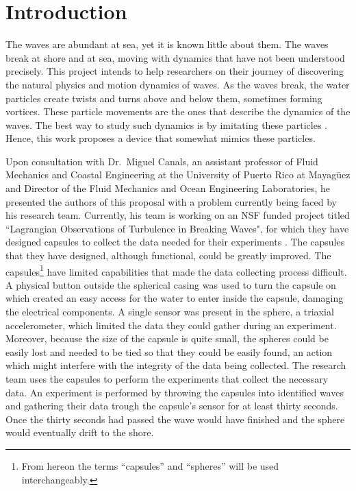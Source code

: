 \section{Introduction}
The waves are abundant at sea, yet it is known little about them. The waves break at shore and at sea, moving with dynamics that have not been understood precisely. This project intends to help researchers on their journey of discovering the natural physics and motion dynamics of waves. As the waves break, the water particles create twists and turns above and below them, sometimes forming vortices. These particle movements are the ones that describe the dynamics of the waves. The best way to study such dynamics is by imitating these particles \cite{Amador2012}. Hence, this work proposes a device that somewhat mimics these particles.

Upon consultation with Dr.~Miguel Canals, an assistant professor of Fluid Mechanics and Coastal Engineering at the University of Puerto Rico at Mayag\"uez and Director of the Fluid Mechanics and Ocean Engineering Laboratories, he presented the authors of this proposal with a problem currently being faced by his research team. Currently, his team is working on an NSF funded project titled ``Lagrangian Observations of Turbulence in Breaking Waves", for which they have designed capsules to collect the data needed for their experiments \cite{Canals2012}.  The capsules that they have designed, although functional, could be greatly improved. The capsules\footnote{From hereon the terms ``capsules'' and ``spheres'' will be used interchangeably.} have limited capabilities that made the data collecting process difficult. A physical button outside the spherical casing was used to turn the capsule on which created an easy access for the water to enter inside the capsule, damaging the electrical components. A single sensor was present in the sphere, a triaxial accelerometer, which limited the data they could gather during an experiment. Moreover, because the size of the capsule is quite small, the spheres could be easily lost and needed to be tied so that they could be easily found, an action which might interfere with the integrity of the data being collected. The research team uses the capsules to perform the experiments that collect the necessary data. An experiment is performed by throwing the capsules into identified waves and gathering their data trough the capsule's sensor for at least thirty seconds. Once the thirty seconds had passed the wave would have finished and the sphere would eventually drift to the shore.

